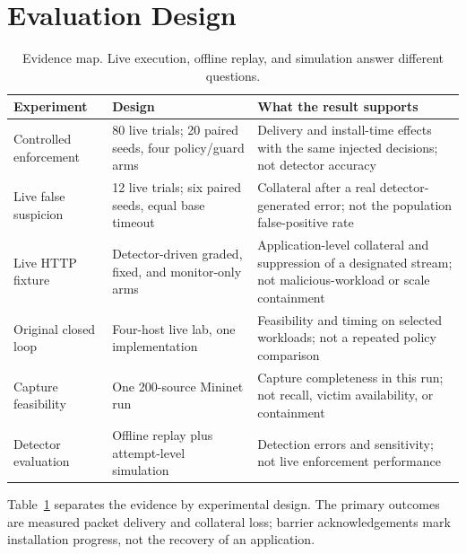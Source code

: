 \documentclass[conference]{IEEEtran}
\begin{document}
\section{Evaluation Design}
\begin{table}[t]
\centering\small
\caption{Evidence map. Live execution, offline replay, and simulation answer different questions.}
\begin{tabular}{@{}p{}p{}p{}@{}}
\toprule Experiment & Design & What the result supports \\
\midrule
Controlled enforcement & 80 live trials; 20 paired seeds, four policy/guard arms &
Delivery and install-time effects with the same injected decisions; not detector accuracy \\
Live false suspicion & 12 live trials; six paired seeds, equal base timeout & Collateral after a real
detector-generated error; not the population false-positive rate \\
Live HTTP fixture & Detector-driven graded, fixed, and monitor-only arms & Application-level
collateral and suppression of a designated stream; not malicious-workload or scale containment \\
Original closed loop & Four-host live lab, one implementation & Feasibility and timing on selected workloads;
not a repeated policy comparison \\
Capture feasibility & One 200-source Mininet run & Capture completeness in this run; not recall,
victim availability, or containment \\
Detector evaluation & Offline replay plus attempt-level simulation & Detection errors and sensitivity;
not live enforcement performance \\
\bottomrule
\end{tabular}
\label{tab:evidence}
\end{table}
Table~\ref{tab:evidence} separates the evidence by experimental design. The
primary outcomes are measured packet delivery and collateral loss; barrier
acknowledgements mark installation progress, not the recovery of an application.
\end{document}
